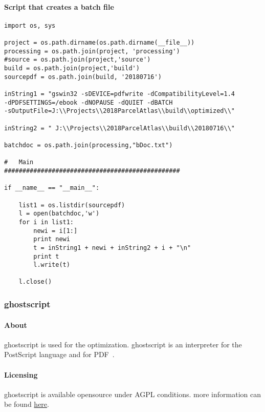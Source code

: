 \paragraph*{Script that creates a batch file}
\begin{verbatim}
import os, sys

project = os.path.dirname(os.path.dirname(__file__))
processing = os.path.join(project, 'processing')
#source = os.path.join(project,'source')
build = os.path.join(project,'build')
sourcepdf = os.path.join(build, '20180716')

inString1 = "gswin32 -sDEVICE=pdfwrite -dCompatibilityLevel=1.4
-dPDFSETTINGS=/ebook -dNOPAUSE -dQUIET -dBATCH
-sOutputFile=J:\\Projects\\2018ParcelAtlas\\build\\optimized\\"

inString2 = " J:\\Projects\\2018ParcelAtlas\\build\\20180716\\"

batchdoc = os.path.join(processing,"bDoc.txt")

#   Main
################################################

if __name__ == "__main__":

    list1 = os.listdir(sourcepdf)
    l = open(batchdoc,'w')
    for i in list1:
        newi = i[1:]
        print newi
        t = inString1 + newi + inString2 + i + "\n"
        print t
        l.write(t)

    l.close()

\end{verbatim}

\subsubsection{ghostscript}

\paragraph{About}
ghostscript is used for the optimization. ghostscript is an interpreter for the PostScript language and for PDF~\cite{ghostscript1}.
\paragraph{Licensing}
ghostscript is available opensource under AGPL conditions.  more information can be found \href{https://www.ghostscript.com/license.html}{here}.
